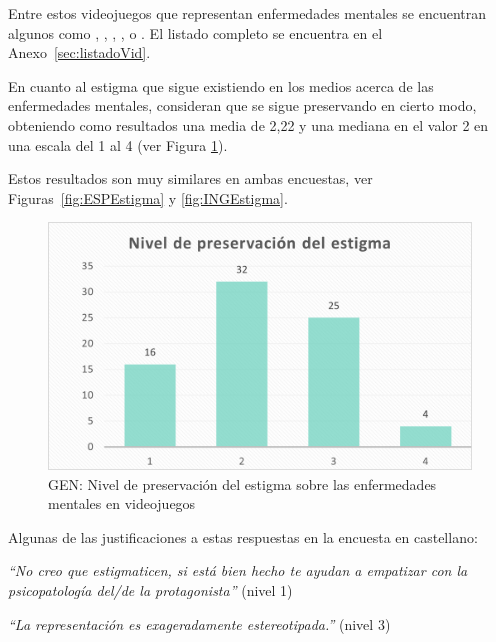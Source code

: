 \documentclass[12pt, a4paper,twoside,titlepage]{book}
\newcommand{\comm}[1]{\todo[linecolor=yellow]{\textsf{#1}}}
\begin{document}
Entre estos videojuegos que representan enfermedades mentales se encuentran algunos como , , , ,  o . El listado completo se encuentra en el Anexo~\ref{sec:listadoVid}.
   
En cuanto al estigma que sigue existiendo en los medios acerca de las enfermedades mentales, consideran que se sigue preservando en cierto modo, obteniendo como resultados una media de 2,22 y una mediana en el valor 2 en una escala del 1 al 4 (ver Figura \ref{fig:Estigma}). 


Estos resultados son muy similares en ambas encuestas, ver Figuras~\ref{fig:ESPEstigma} y \ref{fig:INGEstigma}.  



\begin{figure}
\centering
 \includegraphics[width=.8\linewidth]{Imagenes Form GEN/9GENEstg}
 \caption{GEN: Nivel de preservación del estigma sobre las enfermedades mentales en videojuegos}
 \label{fig:Estigma}
 \end{figure}
 
Algunas de las justificaciones a estas respuestas en la encuesta en castellano:

\textit{``No creo que estigmaticen, si está bien hecho te ayudan a empatizar con la psicopatología del/de la protagonista''} (nivel 1)

\textit{``La representación es exageradamente estereotipada.''} (nivel 3) 
\end{document}

